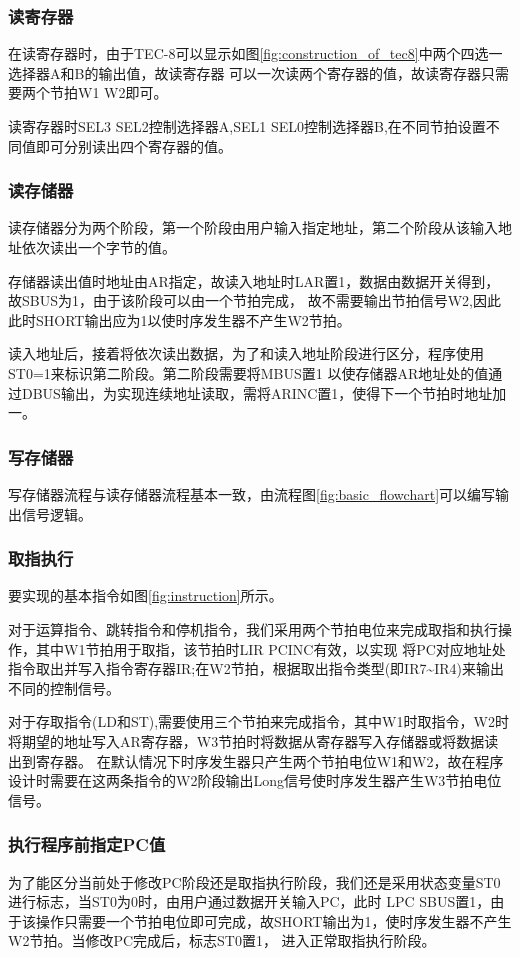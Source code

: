 \subsubsection{读寄存器}
在读寄存器时，由于TEC-8可以显示如图\ref{fig:construction_of_tec8}中两个四选一选择器A和B的输出值，故读寄存器
可以一次读两个寄存器的值，故读寄存器只需要两个节拍W1 W2即可。

读寄存器时SEL3 SEL2控制选择器A,SEL1 SEL0控制选择器B,在不同节拍设置不同值即可分别读出四个寄存器的值。

\subsubsection{读存储器}
读存储器分为两个阶段，第一个阶段由用户输入指定地址，第二个阶段从该输入地址依次读出一个字节的值。

存储器读出值时地址由AR指定，故读入地址时LAR置1，数据由数据开关得到，故SBUS为1，由于该阶段可以由一个节拍完成，
故不需要输出节拍信号W2,因此此时SHORT输出应为1以使时序发生器不产生W2节拍。

读入地址后，接着将依次读出数据，为了和读入地址阶段进行区分，程序使用ST0=1来标识第二阶段。第二阶段需要将MBUS置1
以使存储器AR地址处的值通过DBUS输出，为实现连续地址读取，需将ARINC置1，使得下一个节拍时地址加一。

\subsubsection{写存储器}
写存储器流程与读存储器流程基本一致，由流程图\ref{fig:basic_flowchart}可以编写输出信号逻辑。

\subsubsection{取指执行}
要实现的基本指令如图\ref{fig:instruction}所示。

对于运算指令、跳转指令和停机指令，我们采用两个节拍电位来完成取指和执行操作，其中W1节拍用于取指，该节拍时LIR PCINC有效，以实现
将PC对应地址处指令取出并写入指令寄存器IR;在W2节拍，根据取出指令类型(即IR7\~{}IR4)来输出不同的控制信号。

对于存取指令(LD和ST),需要使用三个节拍来完成指令，其中W1时取指令，W2时将期望的地址写入AR寄存器，W3节拍时将数据从寄存器写入存储器或将数据读出到寄存器。
在默认情况下时序发生器只产生两个节拍电位W1和W2，故在程序设计时需要在这两条指令的W2阶段输出Long信号使时序发生器产生W3节拍电位信号。

\subsubsection{执行程序前指定PC值}
为了能区分当前处于修改PC阶段还是取指执行阶段，我们还是采用状态变量ST0进行标志，当ST0为0时，由用户通过数据开关输入PC，此时
LPC SBUS置1，由于该操作只需要一个节拍电位即可完成，故SHORT输出为1，使时序发生器不产生W2节拍。当修改PC完成后，标志ST0置1，
进入正常取指执行阶段。

